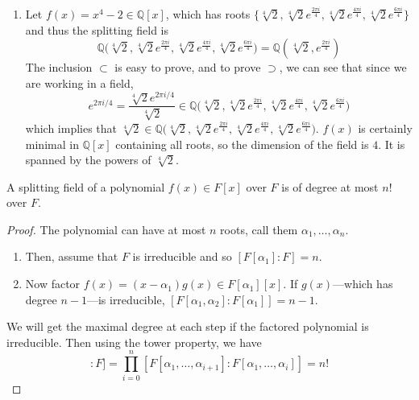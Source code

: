 \begin{example}
\begin{enumerate}
      \item Let $f(x) = x^4 - 2 \in \mathbb{Q}[x]$, which has roots $\{ \sqrt[4]{2}, \sqrt[4]{2} e^{\frac{2\pi i}{4}}, \sqrt[4]{2} e^{\frac{4\pi i}{4}}, \sqrt[4]{2} e^{\frac{6\pi i}{4}} \}$ and thus the splitting field is 
      \begin{equation}
        \mathbb{Q} \big( \sqrt[4]{2}, \sqrt[4]{2} e^{\frac{2\pi i}{4}}, \sqrt[4]{2} e^{\frac{4\pi i}{4}}, \sqrt[4]{2} e^{\frac{6\pi i}{4}} \big) = \mathbb{Q}(\sqrt[4]{2}, e^{\frac{2\pi i}{4}})
      \end{equation}
      The inclusion $\subset$ is easy to prove, and to prove $\supset$, we can see that since we are working in a field, 
      \begin{equation}
        e^{2 \pi i / 4} = \frac{\sqrt[4]{2} e^{2\pi i/4}}{\sqrt[4]{2}} \in \mathbb{Q} \big( \sqrt[4]{2}, \sqrt[4]{2} e^{\frac{2\pi i}{4}}, \sqrt[4]{2} e^{\frac{4\pi i}{4}}, \sqrt[4]{2} e^{\frac{6\pi i}{4}} \big) 
      \end{equation}
      which implies that $\sqrt[4]{2} \in \mathbb{Q} \big( \sqrt[4]{2}, \sqrt[4]{2} e^{\frac{2\pi i}{4}}, \sqrt[4]{2} e^{\frac{4\pi i}{4}}, \sqrt[4]{2} e^{\frac{6\pi i}{4}} \big)$. $f(x)$ is certainly minimal in $\mathbb{Q}[x]$ containing all roots, so the dimension of the field is $4$. It is spanned by the powers of $\sqrt[4]{2}$. 
    \end{enumerate}
  \end{example}

  \begin{theorem}
    A splitting field of a polynomial $f(x) \in F[x]$ over $F$ is of degree at most $n!$ over $F$. 
  \end{theorem}
  \begin{proof}
    The polynomial can have at most $n$ roots, call them $\alpha_1, \ldots, \alpha_n$. 
    \begin{enumerate}
      \item Then, assume that $F$ is irreducible and so $[F[\alpha_1]: F] = n$. 
      \item Now factor $f(x) = (x - \alpha_1) g(x) \in F[\alpha_1][x]$. If $g(x)$---which has degree $n-1$---is irreducible, $[F[\alpha_1, \alpha_2]:F[\alpha_1]] = n-1$. 
    \end{enumerate}
    We will get the maximal degree at each step if the factored polynomial is irreducible. Then using the tower property, we have 
    \begin{equation}
      [F[\alpha_1, \ldots, \alpha_n]:F] = \prod_{i=0}^n [F[\alpha_1, \ldots, \alpha_{i+1}]: F[\alpha_1, \ldots, \alpha_i]] = n!
    \end{equation}
  \end{proof}


